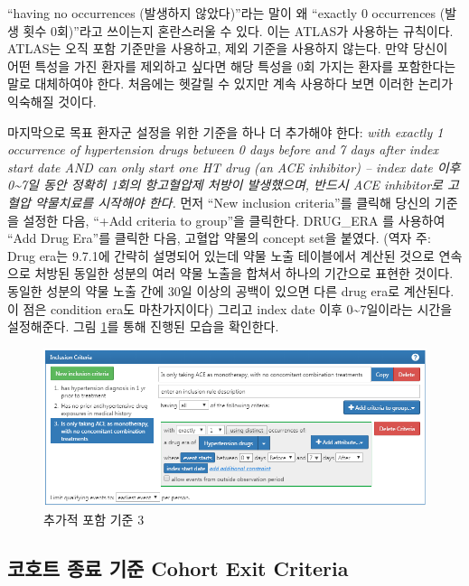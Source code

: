 \documentclass[10.5pt]{book}
\theoremstyle{definition}
\theoremstyle{definition}
\theoremstyle{definition}
\theoremstyle{remark}
\begin{document}
``having no occurrences (발생하지 않았다)''라는 말이 왜 ``exactly 0
occurrences (발생 횟수 0회)''라고 쓰이는지 혼란스러울 수 있다. 이는
ATLAS가 사용하는 규칙이다. ATLAS는 오직 포함 기준만을 사용하고, 제외
기준을 사용하지 않는다. 만약 당신이 어떤 특성을 가진 환자를 제외하고
싶다면 해당 특성을 0회 가지는 환자를 포함한다는 말로 대체하여야 한다.
처음에는 헷갈릴 수 있지만 계속 사용하다 보면 이러한 논리가 익숙해질
것이다.

마지막으로 목표 환자군 설정을 위한 기준을 하나 더 추가해야 한다:
\emph{with exactly 1 occurrence of hypertension drugs between 0 days
before and 7 days after index start date AND can only start one HT drug
(an ACE inhibitor) -- index date 이후 0\textasciitilde{}7일 동안 정확히
1회의 항고혈압제 처방이 발생했으며, 반드시 ACE inhibitor로 고혈압
약물치료를 시작해야 한다.} 먼저 ``New inclusion criteria''를 클릭해
당신의 기준을 설정한 다음, ``+Add criteria to group''을 클릭한다.
DRUG\_ERA 를 사용하여 ``Add Drug Era''를 클릭한 다음, 고혈압 약물의
concept set을 붙였다. (역자 주: Drug era는 9.7.1에 간략히 설명되어
있는데 약물 노출 테이블에서 계산된 것으로 연속으로 처방된 동일한 성분의
여러 약물 노출을 합쳐서 하나의 기간으로 표현한 것이다. 동일한 성분의
약물 노출 간에 30일 이상의 공백이 있으면 다른 drug era로 계산된다. 이
점은 condition era도 마찬가지이다) 그리고 index date 이후
0\textasciitilde{}7일이라는 시간을 설정해준다. 그림 \ref{fig:ATLASIC3}를
통해 진행된 모습을 확인한다.

\begin{figure}

{\centering \includegraphics[width=1\linewidth]{images/Cohorts/ATLAS-IC3} 

}

\caption{추가적 포함 기준 3}\label{fig:ATLASIC3}
\end{figure}

\subsection{코호트 종료 기준 Cohort Exit
Criteria}\label{---cohort-exit-criteria}
\end{document}
